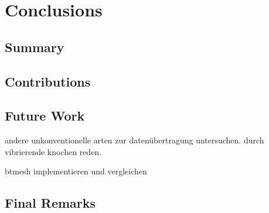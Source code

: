 \chapter{Conclusions}
\label{ch:closure}

\section{Summary}

\section{Contributions}

\section{Future Work}
andere unkonventionelle arten zur datenübertragung untersuchen. durch vibrierende knochen reden.

btmesh implementieren und vergleichen

\section{Final Remarks}
